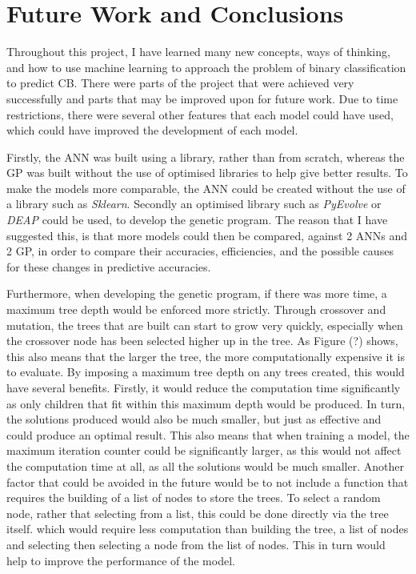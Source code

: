 \documentclass[11pt]{article}
\begin{document}
\section{Future Work and Conclusions}\label{sec:FWC}
Throughout this project, I have learned many new concepts, ways of thinking, and how to use machine learning to approach the problem of binary classification to predict CB. There were parts of the project that were achieved very successfully and parts that may be improved upon for future work.  Due to time restrictions, there were several other features that each model could have used, which could have improved the development of each model.

Firstly, the ANN was built using a library, rather than from scratch, whereas the GP was built without the use of optimised libraries to help give better results. To make the models more comparable, the ANN could be created without the use of a library such as \textit{Sklearn}. Secondly an optimised library such as \textit{PyEvolve} or \textit{DEAP} could be used, to develop the genetic program. The reason that I have suggested this, is that more models could then be compared, against 2 ANNs and 2 GP, in order to compare their accuracies, efficiencies, and the possible causes for these changes in predictive accuracies. 

Furthermore, when developing the genetic program, if there was more time, a maximum tree depth would be enforced more strictly. Through crossover and mutation, the trees that are built can start to grow very quickly, especially when the crossover node has been selected higher up in the tree. As Figure (?) shows, this also means that the larger the tree, the more computationally expensive it is to evaluate. By imposing a maximum tree depth on any trees created, this would have several benefits. Firstly, it would reduce the computation time significantly as only children that fit within this maximum depth would be produced. In turn, the solutions produced would also be much smaller, but just as effective and could produce an optimal result. This also means that when training a model, the maximum iteration counter could be significantly larger, as this would not affect the computation time at all, as all the solutions would be much smaller.
Another factor that could be avoided in the future would be to not include a function that requires the building of a list of nodes to store the trees. To select a random node, rather that selecting from a list, this could be done directly via the tree itself. which would require less computation than building the tree, a list of nodes and selecting then selecting a node from the list of nodes. This in turn would help to improve the performance of the model.  
\end{document}
